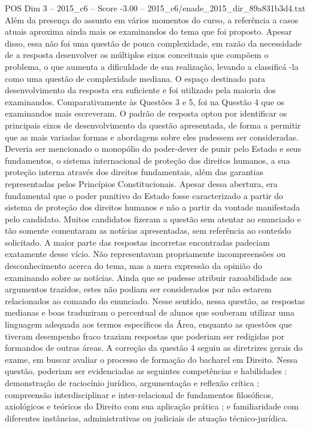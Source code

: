 \begin{textsample}{POS Dim 3 – 2015\_c6 – Score -3.00 – 2015\_c6/enade\_2015\_dir\_89a831b3d4.txt}
Além da presença do assunto em vários momentos do curso, a referência a casos atuais aproxima ainda mais os examinandos do tema que foi proposto.
Apesar disso, essa não foi uma questão de pouca complexidade, em razão da necessidade de a resposta desenvolver os múltiplos eixos conceituais que compõem o problema, o que aumenta a dificuldade de sua realização, levando a classificá -la como uma questão de complexidade mediana.
O espaço destinado para desenvolvimento da resposta era suficiente e foi utilizado pela maioria dos examinandos.
Comparativamente às Questões 3 e 5, foi na Questão 4 que os examinandos mais escreveram.
O padrão de resposta optou por identificar os principais eixos de desenvolvimento da questão apresentada, de forma a permitir que as mais variadas formas e abordagens sobre eles pudessem ser consideradas.
Deveria ser mencionado o monopólio do poder-dever de punir pelo Estado e seus fundamentos, o sistema internacional de proteção dos direitos humanos, a sua proteção interna através dos direitos fundamentais, além das garantias representadas pelos Princípios Constitucionais.
Apesar dessa abertura, era fundamental que o poder punitivo do Estado fosse caracterizado a partir do sistema de proteção dos direitos humanos e não a partir da vontade manifestada pelo candidato.
Muitos candidatos fizeram a questão sem atentar ao enunciado e tão somente comentaram as notícias apresentadas, sem referência ao conteúdo solicitado.
A maior parte das respostas incorretas encontradas padeciam exatamente desse vício.
Não representavam propriamente incompreensões ou desconhecimento acerca do tema, mas a mera expressão da opinião do examinando sobre as notícias.
Ainda que se pudesse atribuir razoabilidade aos argumentos trazidos, estes não podiam ser considerados por não estarem relacionados ao comando do enunciado.
Nesse sentido, nessa questão, as respostas medianas e boas traduziram o percentual de alunos que souberam utilizar uma linguagem adequada aos termos específicos da Área, enquanto as questões que tiveram desempenho fraco traziam respostas que poderiam ser redigidas por formandos de outras áreas.
A correção da questão 4 seguiu as diretrizes gerais do exame, em buscar avaliar o processo de formação do bacharel em Direito.
Nessa questão, poderiam ser evidenciadas as seguintes competências e habilidades : demonstração de raciocínio jurídico, argumentação e reflexão crítica ; compreensão interdisciplinar e inter-relacional de fundamentos filosóficos, axiológicos e teóricos do Direito com sua aplicação prática ; e familiaridade com diferentes instâncias, administrativas ou judiciais de atuação técnico-jurídica.

\end{textsample}
